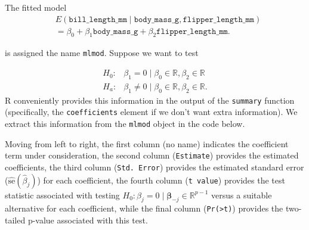 \documentclass[
]{book}
\newenvironment{Shaded}{\begin{snugshade}}{\end{snugshade}}
\newcommand{\DocumentationTok}[1]{\textcolor[rgb]{0.56,0.35,0.01}{\textbf{\textit{#1}}}}
\newcommand{\FunctionTok}[1]{\textcolor[rgb]{0.00,0.00,0.00}{#1}}
\newcommand{\NormalTok}[1]{#1}
\newcommand{\SpecialCharTok}[1]{\textcolor[rgb]{0.00,0.00,0.00}{#1}}
\theoremstyle{definition}
\theoremstyle{definition}
\theoremstyle{definition}
\theoremstyle{definition}
\theoremstyle{remark}
\begin{document}
The fitted model
\[
\begin{aligned}
&E(\mathtt{bill\_length\_mm}\mid \mathtt{body\_mass\_g}, \mathtt{flipper\_length\_mm}) \\
&=\beta_0+\beta_1 \mathtt{body\_mass\_g} + \beta_2 \mathtt{flipper\_length\_mm}.
\end{aligned}
\]

is assigned the name \texttt{mlmod}. Suppose we want to test

\[
\begin{aligned}
H_0: &\beta_1 = 0 \mid \beta_0\in \mathbb{R}, \beta_2 \in \mathbb{R} \\
H_a: &\beta_1 \neq 0 \mid \beta_0\in \mathbb{R}, \beta_2 \in \mathbb{R}.
\end{aligned}
\]
R conveniently provides this information in the output of the \texttt{summary} function (specifically, the \texttt{coefficients} element if we don't want extra information). We extract this information from the \texttt{mlmod} object in the code below.

\begin{Shaded}
\end{Shaded}

Moving from left to right, the first column (no name) indicates the coefficient term under consideration, the second column (\texttt{Estimate}) provides the estimated coefficients, the third column (\texttt{Std.\ Error}) provides the estimated standard error (\(\hat{\mathrm{se}}(\hat{\beta}_j)\)) for each coefficient, the fourth column (\texttt{t\ value}) provides the test statistic associated with testing \(H_0: \beta_j = 0 \mid \boldsymbol{\beta}_{-j} \in \mathbb{R}^{p-1}\) versus a suitable alternative for each coefficient, while the final column (\texttt{Pr(\textgreater{}\textbar{}t\textbar{})}) provides the two-tailed p-value associated with this test.
\end{document}
